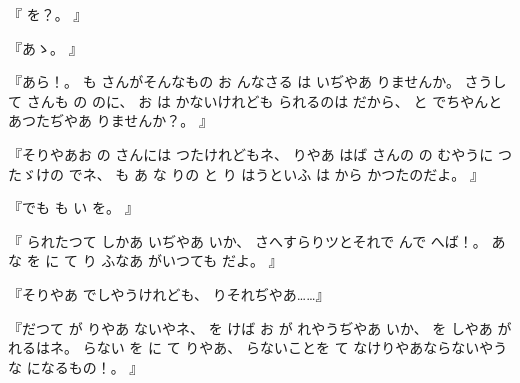 『
を？。
』

『あゝ。
』

『あら！。
%
も
さんがそんなもの
お
んなさる
は
いぢやあ
りませんか。
%
さうして
さんも
の
のに、
%
お
は
かないけれども
られるのは
だから、
%
と
でちやんと
あつたぢやあ
りませんか？。
』

『そりやあお
の
さんには
つたけれどもネ、
%
りやあ
はば
さんの
の
むやうに
つたゞけの
でネ、
%
も
あ
な
りの
と
り
はうといふ
は
から
かつたのだよ。
』

『でも
も
い
を。
』

『
られたつて
しかあ
いぢやあ
いか、
%
さへすらりツとそれで
んで
へば！。
%
あ
な
を
に
て
り
ふなあ
がいつても
だよ。
』

『そりやあ
でしやうけれども、
%
りそれぢやあ……』

『だつて
が
りやあ
ないやネ、
%
を
けば
お
が
れやうぢやあ
いか、
%
を
しやあ
が
れるはネ。
%
らない
を
に
て
りやあ、
%
らないことを
て
なけりやあならないやうな
になるもの！。
』
